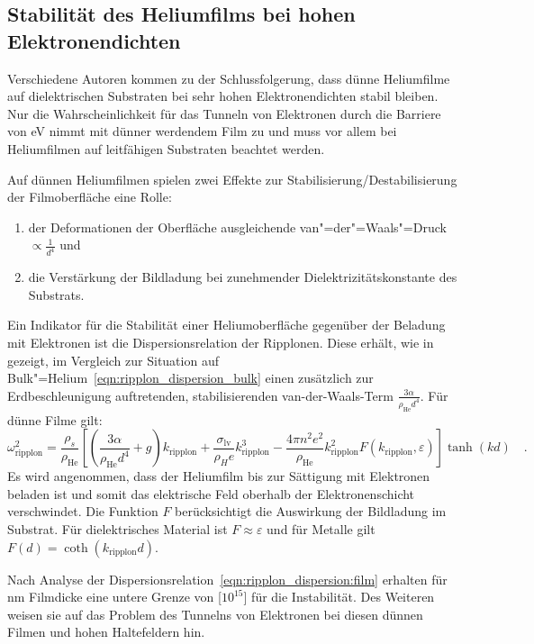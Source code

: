 \subsection{Stabilität des Heliumfilms bei hohen Elektronendichten}
\label{ssec:film_stability}

Verschiedene Autoren \cite{Ike81,Etz84,Hu90} kommen zu der Schlussfolgerung, dass dünne Heliumfilme auf dielektrischen Substraten bei sehr hohen Elektronendichten stabil bleiben. Nur die Wahrscheinlichkeit für das Tunneln von Elektronen durch die Barriere von \unit[1]{eV} nimmt mit dünner werdendem Film zu und muss vor allem bei Heliumfilmen auf leitfähigen Substraten beachtet werden.

Auf dünnen Heliumfilmen spielen zwei Effekte zur Stabilisierung/Destabilisierung der Filmoberfläche eine Rolle:
\begin{enumerate}
    \item der Deformationen der Oberfläche ausgleichende van"=der"=Waals"=Druck $\propto\frac1{d^4}$ und
    \item die Verstärkung der Bildladung bei zunehmender Dielektrizitätskonstante des Substrats.
\end{enumerate}
Ein Indikator für die Stabilität einer Heliumoberfläche gegenüber der Beladung mit Elektronen ist die Dispersionsrelation der Ripplonen.
Diese erhält, wie in  \ea{} \cite{Ike81} gezeigt, im Vergleich zur Situation auf Bulk"=Helium~\eqref{eqn:ripplon_dispersion_bulk} einen zusätzlich zur Erdbeschleunigung auftretenden, stabilisierenden van-der-Waals-Term $\frac{3\alpha}{\rho_\text{He} d^4}$. Für dünne Filme gilt:
    \begin{equation}
        \label{eqn:ripplon_dispersion:film}
        \omega^2_\text{ripplon}=\frac{\rho_s}{\rho_\text{He}}
			\left[\left(\frac{3\alpha}{\rho_\text{He} d^4}+g\right)k_\text{ripplon}+
            \frac{\sigma_\text{lv}}{\rho_He} k^3_\text{ripplon}-
			\frac{4\pi n^2e^2}{\rho_\text{He}} k^2_\text{ripplon}
				F(k_\text{ripplon},\varepsilon)\right]\tanh(k d)\quad.
    \end{equation}
Es wird angenommen, dass der Heliumfilm bis zur Sättigung mit Elektronen beladen ist und somit das elektrische Feld oberhalb der Elektronenschicht verschwindet. Die Funktion $F$ berücksichtigt die Auswirkung der Bildladung im Substrat. Für dielektrisches Material ist $F\approx\varepsilon$ und für Metalle gilt $F(d)=\coth(k_\text{ripplon}d)$.

Nach Analyse der Dispersionsrelation~\eqref{eqn:ripplon_dispersion:film} erhalten  \ea{} für \unit[10]{nm} Filmdicke eine untere Grenze  von \unit[$10^{15}$]{\Em} für die Instabilität. Des Weiteren weisen sie auf das Problem des Tunnelns von Elektronen bei diesen dünnen Filmen und hohen Haltefeldern hin.

